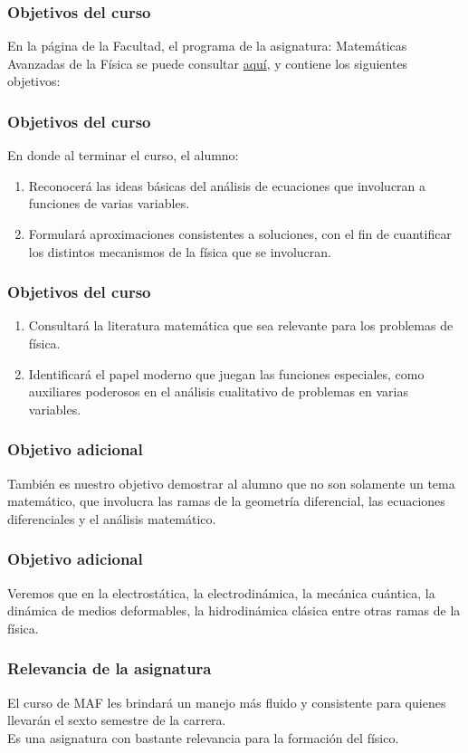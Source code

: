 \documentclass[12pt]{beamer}
\begin{document}
\begin{frame}
\frametitle{Objetivos del curso}
En la página de la Facultad, el programa de la asignatura: Matemáticas Avanzadas de la Física se puede consultar 
\href{https://www.fciencias.unam.mx/sites/default/files/temario/610.pdf}{aquí}, y contiene los siguientes objetivos:
\end{frame}
\begin{frame}
\frametitle{Objetivos del curso}
En donde al terminar el curso, el alumno:
\begin{enumerate}[<+->]
\item Reconocerá las ideas básicas del análisis de ecuaciones que involucran a funciones de varias variables.
\item Formulará aproximaciones consistentes a soluciones, con el fin de cuantificar los distintos mecanismos de la física que se involucran.
\seti
\end{enumerate}
\end{frame}
\begin{frame}
\frametitle{Objetivos del curso}
\begin{enumerate}[<+->]
\conti
\item Consultará la literatura matemática que sea relevante para los problemas de física.
\item Identificará el papel moderno que juegan las funciones especiales, como auxiliares poderosos en el análisis cualitativo de problemas en varias variables.
\end{enumerate}
\end{frame}
\begin{frame}
\frametitle{Objetivo adicional}
También es nuestro objetivo demostrar al alumno que  no son solamente un tema matemático, que involucra las ramas de la geometría diferencial, las ecuaciones diferenciales y el análisis matemático.
\end{frame}
\begin{frame}
\frametitle{Objetivo adicional}
Veremos que  en la electrostática, la electrodinámica, la mecánica cuántica, la dinámica de medios deformables, la hidrodinámica clásica entre otras ramas de la física.
\end{frame}
\begin{frame}
\frametitle{Relevancia de la asignatura}
El curso de MAF les brindará un manejo más fluido y consistente para quienes llevarán el sexto semestre de la carrera.
\\
\bigskip
\pause
Es una asignatura con bastante relevancia para la formación del físico.
\end{frame}
\end{document}
